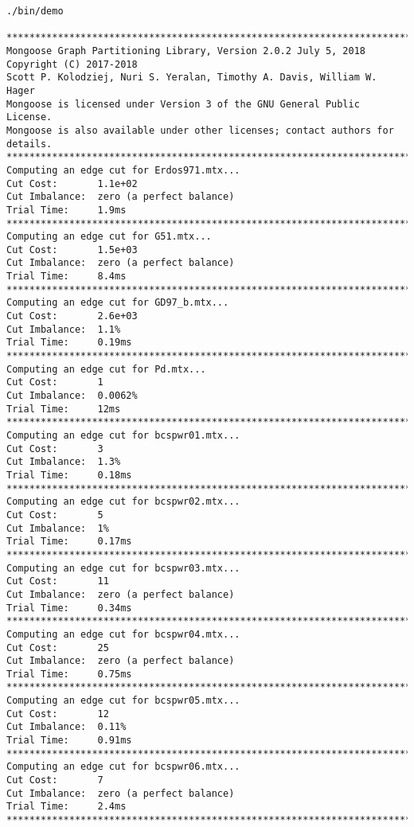 \documentclass[letter]{article}
\begin{document}
\begin{lstlisting}[numbers=none,xleftmargin=.09\textwidth, xrightmargin=.09\textwidth,keywordstyle=\color{black}]
./bin/demo

********************************************************************************
Mongoose Graph Partitioning Library, Version 2.0.2 July 5, 2018
Copyright (C) 2017-2018
Scott P. Kolodziej, Nuri S. Yeralan, Timothy A. Davis, William W. Hager
Mongoose is licensed under Version 3 of the GNU General Public License.
Mongoose is also available under other licenses; contact authors for details.
********************************************************************************
Computing an edge cut for Erdos971.mtx...
Cut Cost:       1.1e+02
Cut Imbalance:  zero (a perfect balance)
Trial Time:     1.9ms
********************************************************************************
Computing an edge cut for G51.mtx...
Cut Cost:       1.5e+03
Cut Imbalance:  zero (a perfect balance)
Trial Time:     8.4ms
********************************************************************************
Computing an edge cut for GD97_b.mtx...
Cut Cost:       2.6e+03
Cut Imbalance:  1.1%
Trial Time:     0.19ms
********************************************************************************
Computing an edge cut for Pd.mtx...
Cut Cost:       1
Cut Imbalance:  0.0062%
Trial Time:     12ms
********************************************************************************
Computing an edge cut for bcspwr01.mtx...
Cut Cost:       3
Cut Imbalance:  1.3%
Trial Time:     0.18ms
********************************************************************************
Computing an edge cut for bcspwr02.mtx...
Cut Cost:       5
Cut Imbalance:  1%
Trial Time:     0.17ms
********************************************************************************
Computing an edge cut for bcspwr03.mtx...
Cut Cost:       11
Cut Imbalance:  zero (a perfect balance)
Trial Time:     0.34ms
********************************************************************************
Computing an edge cut for bcspwr04.mtx...
Cut Cost:       25
Cut Imbalance:  zero (a perfect balance)
Trial Time:     0.75ms
********************************************************************************
Computing an edge cut for bcspwr05.mtx...
Cut Cost:       12
Cut Imbalance:  0.11%
Trial Time:     0.91ms
********************************************************************************
Computing an edge cut for bcspwr06.mtx...
Cut Cost:       7
Cut Imbalance:  zero (a perfect balance)
Trial Time:     2.4ms
********************************************************************************

\end{lstlisting}
\end{document}
